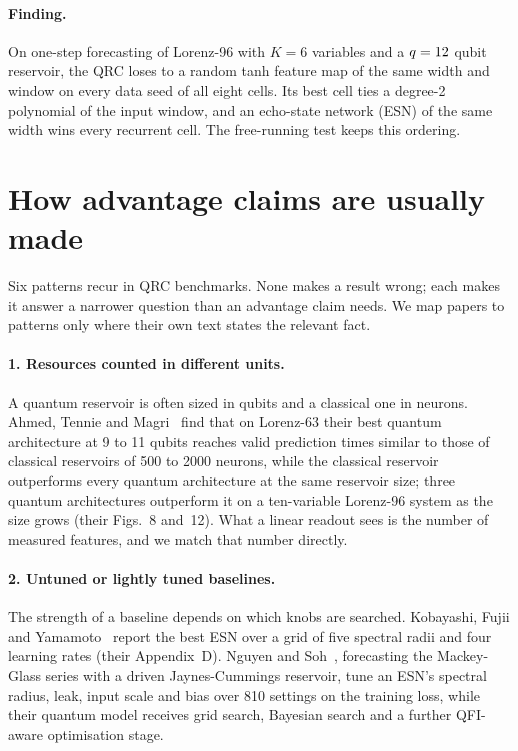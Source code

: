 \documentclass[11pt,a4paper]{article}
\begin{document}
\paragraph{Finding.} On one-step forecasting of Lorenz-96 with $K=6$ variables and a
$q=12$ qubit reservoir, the QRC loses to a random tanh feature map of the same width and window
on every data seed of all eight cells. Its best cell ties a degree-2 polynomial of the input window,
and an echo-state network (ESN) of the same width wins every recurrent cell. The free-running test
keeps this ordering.

\section{How advantage claims are usually made}
\label{sec:related}

Six patterns recur in QRC benchmarks. None makes a result wrong; each makes it answer a narrower
question than an advantage claim needs. We map papers to patterns only where their own text states
the relevant fact.

\paragraph{1. Resources counted in different units.} A quantum reservoir is often sized in qubits
and a classical one in neurons. Ahmed, Tennie and Magri~\cite{ahmed2024} find that on Lorenz-63
their best quantum architecture at 9 to 11 qubits reaches valid prediction times similar to those of
classical reservoirs of 500 to 2000 neurons, while the classical reservoir outperforms every quantum
architecture at the same reservoir size; three quantum architectures outperform it on a
ten-variable Lorenz-96 system as the size grows (their Figs.~8 and~12). What a linear readout sees is
the number of measured features, and we match that number directly.

\paragraph{2. Untuned or lightly tuned baselines.} The strength of a baseline depends on which knobs
are searched. Kobayashi, Fujii and Yamamoto~\cite{kobayashi2024} report the best ESN over a grid of
five spectral radii and four learning rates (their Appendix~D). Nguyen and Soh~\cite{nguyen2026},
forecasting the Mackey-Glass series with a driven Jaynes-Cummings reservoir, tune an ESN's spectral
radius, leak, input scale and bias over 810 settings on the training loss, while their quantum model
receives grid search, Bayesian search and a further QFI-aware optimisation stage.
\end{document}

